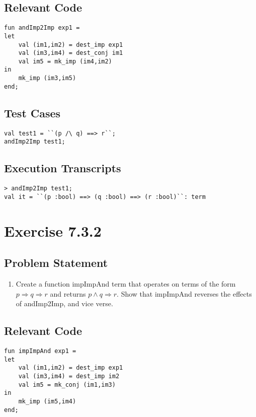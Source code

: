 \documentclass[twoside]{report}
\begin{document}
\section{Relevant Code}
    \begin{lstlisting}[frame=trBL]
fun andImp2Imp exp1 = 
let
	val (im1,im2) = dest_imp exp1
	val (im3,im4) = dest_conj im1
	val im5 = mk_imp (im4,im2)
in
	mk_imp (im3,im5)
end;
    \end{lstlisting}
\section{Test Cases}
\begin{scriptsize}
    \begin{verbatim}
val test1 = ``(p /\ q) ==> r``;
andImp2Imp test1;
    \end{verbatim}
\end{scriptsize}
\section{Execution Transcripts}
\begin{scriptsize}
    \begin{verbatim}
> andImp2Imp test1;
val it = ``(p :bool) ==> (q :bool) ==> (r :bool)``: term
    \end{verbatim}
\end{scriptsize}


\chapter{Exercise 7.3.2}
\label{cha:7-3-2}
\section{Problem Statement}
\begin{enumerate}
    \item Create a function impImpAnd term that operates on terms of the form $p \Rightarrow q \Rightarrow r$ and returns $p \wedge q \Rightarrow r$. Show that impImpAnd reverses the effects of andImp2Imp, and vice verse.
\end{enumerate}
\section{Relevant Code}
    \begin{lstlisting}[frame=trBL]
fun impImpAnd exp1 = 
let
	val (im1,im2) = dest_imp exp1
	val (im3,im4) = dest_imp im2
	val im5 = mk_conj (im1,im3)
in
	mk_imp (im5,im4)
end;
    \end{lstlisting}
\end{document}
